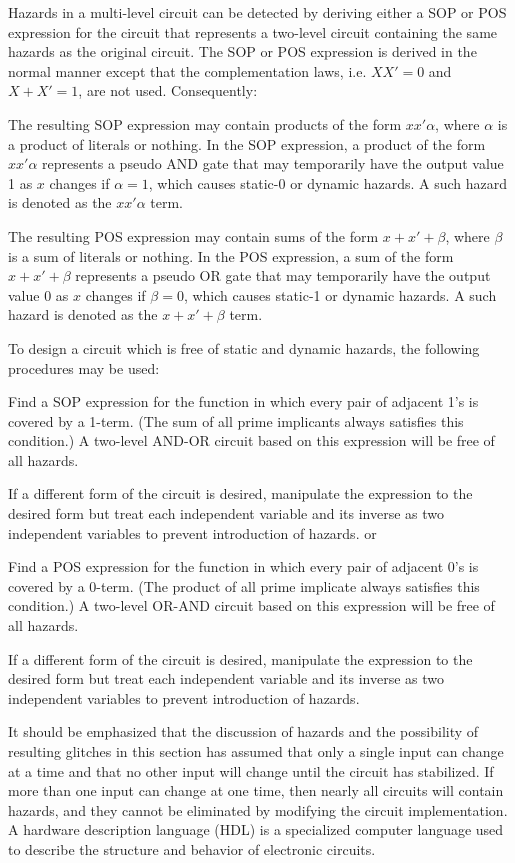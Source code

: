 \documentclass[a4paper,12pt]{report}
\begin{document}
Hazards in a multi-level circuit can be detected by deriving either a SOP or POS expression for the circuit that represents a two-level circuit containing the same hazards as the original circuit. The SOP or POS expression is derived in the normal manner except that the complementation laws, i.e. $XX'=0$ and $X+X'=1$, are not used. Consequently:
\bit
\item The resulting SOP expression may contain products of the form $xx'\alpha$, where $\alpha$ is a product of literals or nothing. In the SOP expression, a product of the form $xx'\alpha$ represents a pseudo AND gate that may temporarily have the output value 1 as $x$ changes if $\alpha=1$, which causes static-0 or dynamic hazards. A such hazard is denoted as the $xx'\alpha$ term.
\item The resulting POS expression may contain sums of the form $x+x'+\beta$, where $\beta$ is a sum of literals or nothing. In the POS expression, a sum of the form $x+x'+\beta$ represents a pseudo OR gate that may temporarily have the output value 0 as $x$ changes if $\beta=0$, which causes static-1 or dynamic hazards. A such hazard is denoted as the $x+x'+\beta$ term.
\eit

To design a circuit  which is free of static and dynamic hazards, the following procedures may be used:
\ben
\item Find a SOP expression for the function in which every pair of adjacent 1's is covered by a 1-term. (The sum of all prime implicants always satisfies this condition.) A two-level AND-OR circuit based on this expression will be free of all hazards.
\item If a different form of the circuit is desired, manipulate the expression to the desired form but treat each independent variable and its inverse as two independent variables to prevent introduction of hazards.
\een
or
\ben
\item Find a POS expression for the function in which every pair of adjacent 0's is covered by a 0-term. (The product of all prime implicate always satisfies this condition.) A two-level OR-AND circuit based on this expression will be free of all hazards.
\item If a different form of the circuit is desired, manipulate the expression to the desired form but treat each independent variable and its inverse as two independent variables to prevent introduction of hazards.
\een

It should be emphasized that the discussion of hazards and the possibility of resulting glitches in this section has assumed that only a single input can change at a time and that no other input will change until the circuit has stabilized. If more than one input can change at one time, then nearly all circuits will contain hazards, and they cannot be eliminated by modifying the circuit implementation.
A hardware description language (HDL) is a specialized computer language used to describe the structure and behavior of electronic circuits.
\end{document}
